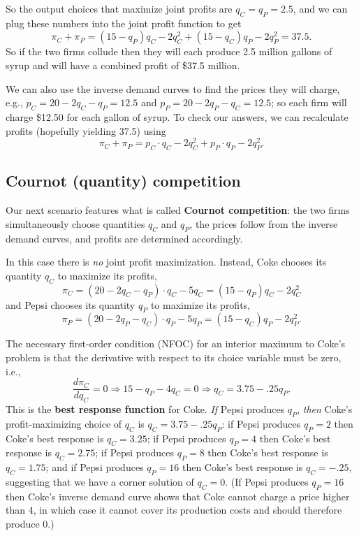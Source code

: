 So the output choices that maximize joint profits are $q_C=q_P=2.5$, and we can plug these numbers into the joint profit function to get
\[
\pi_C+\pi_P = (15-q_P)q_C - 2 q_C^2 + (15-q_C)q_P - 2 q_P^2 = 37.5.
\]
So if the two firms collude then they will each produce 2.5 million gallons of syrup and will have a combined profit of \$37.5 million.

We can also use the inverse demand curves to find the prices they will charge, e.g., $p_C=20-2q_C-q_P =12.5$ and
$p_P=20-2q_P-q_C=12.5$; so each firm will charge \$12.50 for each gallon of syrup. To check our answers, we can recalculate profits (hopefully yielding 37.5) using
\[
\pi_C+\pi_P = p_C\cdot q_C - 2 q_C^2 + p_P\cdot q_P - 2 q_P^2.
\]




\subsection*{Cournot (quantity) competition}

Our next scenario features what is called \textbf{Cournot competition}: the two firms simultaneously choose quantities $q_C$ and $q_P$, the prices follow from the inverse demand curves, and profits are determined accordingly.

In this case there is \emph{no} joint profit maximization. Instead, Coke chooses its quantity $q_C$ to maximize its profits,
\[
\pi_C  =  (20-2q_C-q_P)\cdot q_C - 5q_C = (15-q_P)q_C - 2 q_C^2
\]
and Pepsi chooses its quantity $q_P$ to maximize its profits,
\[
\pi_P = (20-2q_P-q_C)\cdot q_P - 5q_P = (15-q_C)q_P - 2 q_P^2.
\]

The necessary first-order condition (NFOC) for an interior maximum to Coke's problem is that the derivative with respect to its choice variable must be zero, i.e.,
\[
\frac{d\pi_C}{d q_C}=0\Longrightarrow 15-q_P-4q_C=0\Longrightarrow
q_C=3.75-.25q_P.
\]
This is the \textbf{best response function} for Coke. \emph{If} Pepsi produces $q_P$, \emph{then} Coke's profit-maximizing choice of $q_C$ is $q_C=3.75-.25q_P$: if Pepsi produces $q_P=2$ then Coke's best response is $q_C=3.25$; if Pepsi produces $q_P=4$ then Coke's best response is $q_C=2.75$; if Pepsi produces $q_P=8$ then Coke's best response is $q_C=1.75$; and if Pepsi produces $q_P=16$ then Coke's best response is $q_C=-.25$, suggesting that we have a corner solution of $q_C=0$. (If Pepsi produces $q_P=16$ then Coke's inverse demand curve shows that Coke cannot charge a price higher than 4, in which case it cannot cover its production costs and should therefore produce 0.)


